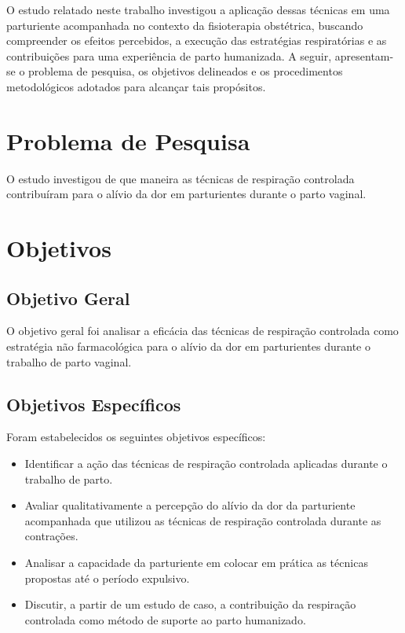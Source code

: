 \documentclass[openright]{tex/estilos/normas-utf-tex}
\begin{document}
O estudo relatado neste trabalho investigou a aplicação dessas técnicas em uma parturiente acompanhada no contexto da fisioterapia obstétrica, buscando compreender os efeitos percebidos, a execução das estratégias respiratórias e as contribuições para uma experiência de parto humanizada. A seguir, apresentam-se o problema de pesquisa, os objetivos delineados e os procedimentos metodológicos adotados para alcançar tais propósitos.

\section{Problema de Pesquisa}
\label{sec:problema}

O estudo investigou de que maneira as técnicas de respiração controlada contribuíram para o alívio da dor em parturientes durante o parto vaginal.

\section{Objetivos}
\label{sec:objetivos}

\subsection{Objetivo Geral}
\label{subsec:objetivo-geral}

O objetivo geral foi analisar a eficácia das técnicas de respiração controlada como estratégia não farmacológica para o alívio da dor em parturientes durante o trabalho de parto vaginal.

\subsection{Objetivos Específicos}
\label{subsec:objetivos-especificos}

Foram estabelecidos os seguintes objetivos específicos:

\begin{itemize}
    \item Identificar a ação das técnicas de respiração controlada aplicadas durante o trabalho de parto.
    \item Avaliar qualitativamente a percepção do alívio da dor da parturiente acompanhada que utilizou as técnicas de respiração controlada durante as contrações.
    \item Analisar a capacidade da parturiente em colocar em prática as técnicas propostas até o período expulsivo.
    \item Discutir, a partir de um estudo de caso, a contribuição da respiração controlada como método de suporte ao parto humanizado.
\end{itemize}
\end{document}
